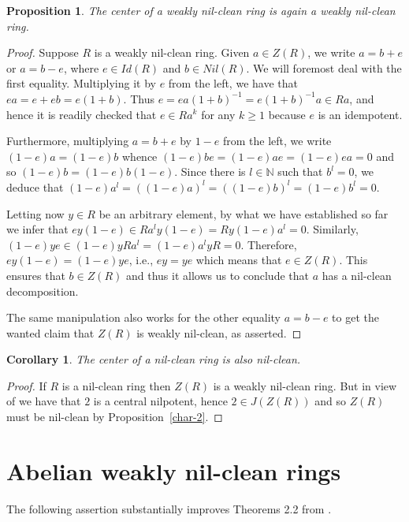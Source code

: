 \documentclass[12]{amsart}
\newtheorem{cor}[thm]{Corollary}
\newtheorem{prop}[thm]{Proposition}
\theoremstyle{definition}
\numberwithin{equation}{section}
\begin{document}
\begin{prop}\label{center} The center of a weakly nil-clean ring is again a weakly nil-clean ring.
\end{prop}

\begin{proof} Suppose $R$ is a weakly nil-clean ring. Given $a\in Z(R)$, we write $a=b+e$ or $a=b-e$, where $e\in Id(R)$ and $b\in Nil(R)$. We will foremost deal with the first equality. Multiplying it by $e$ from the left, we have that $ea=e+eb=e(1+b)$. Thus $e=ea(1+b)^{-1}=e(1+b)^{-1}a\in Ra$, and hence it is readily checked that $e\in Ra^k$ for any $k\geq 1$ because $e$ is an idempotent.

Furthermore, multiplying $a=b+e$ by $1-e$ from the left, we write $(1-e)a=(1-e)b$ whence $(1-e)be=(1-e)ae=(1-e)ea=0$ and so $(1-e)b=(1-e)b(1-e)$. Since there is $l\in \mathbb{N}$ such that $b^l=0$, we deduce that $(1-e)a^l=((1-e)a)^l=((1-e)b)^l=(1-e)b^l=0$.

Letting now $y\in R$ be an arbitrary element, by what we have established so far we infer that $ey(1-e)\in Ra^ly(1-e)=Ry(1-e)a^l=0$. Similarly, $(1-e)ye\in (1-e)yRa^l=(1-e)a^lyR=0$. Therefore, $ey(1-e)=(1-e)ye$, i.e., $ey=ye$ which means that $e\in Z(R)$. This ensures that $b\in Z(R)$ and thus it allows us to conclude that $a$ has a nil-clean decomposition.

The same manipulation also works for the other equality $a=b-e$ to get the wanted claim that $Z(R)$ is weakly nil-clean, as asserted.
\end{proof}

\begin{cor} The center of a nil-clean ring is also nil-clean.
\end{cor}

\begin{proof}
If $R$ is a nil-clean ring then $Z(R)$ is a weakly nil-clean ring. But in view of \cite{D13} we have that $2$ is a central nilpotent, hence $2\in J(Z(R))$ and so $Z(R)$ must be nil-clean by Proposition~\ref{char-2}.
\end{proof}

\section{Abelian weakly nil-clean rings}

The following assertion substantially improves Theorems 2.2 from \cite{Ch}.
\end{document}
